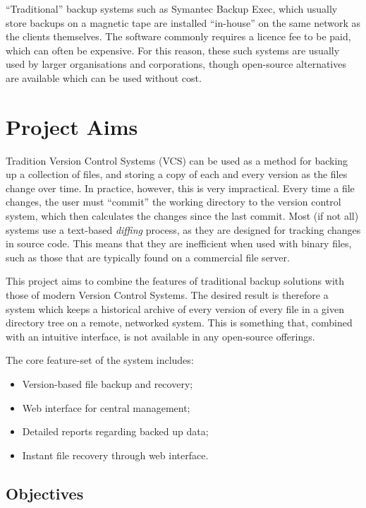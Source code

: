 ``Traditional'' backup systems such as Symantec Backup Exec, which usually
store backups on a magnetic tape are installed ``in-house'' on the same network
as the clients themselves. The software commonly requires a licence fee to be
paid, which can often be expensive. For this reason, these such systems are
usually used by larger organisations and corporations, though open-source
alternatives are available which can be used without cost.

\section{Project Aims}

Tradition Version Control Systems (VCS) can be used as a method for backing up
a collection of files, and storing a copy of each and every version as the
files change over time. In practice, however, this is very impractical. Every
time a file changes, the user must ``commit'' the working directory to the
version control system, which then calculates the changes since the last
commit. Most (if not all) systems use a text-based \emph{diffing} process, as
they are designed for tracking changes in source code. This means that they are
inefficient when used with binary files, such as those that are typically found
on a commercial file server.

This project aims to combine the features of traditional backup solutions with
those of modern Version Control Systems. The desired result is therefore
a system which keeps a historical archive of every version of every file in
a given directory tree on a remote, networked system. This is something that,
combined with an intuitive interface, is not available in any open-source
offerings.

The core feature-set of the system includes:

\begin{itemize}
    \item Version-based file backup and recovery;
    \item Web interface for central management;
    \item Detailed reports regarding backed up data;
    \item Instant file recovery through web interface.
\end{itemize}

\subsection{Objectives}

